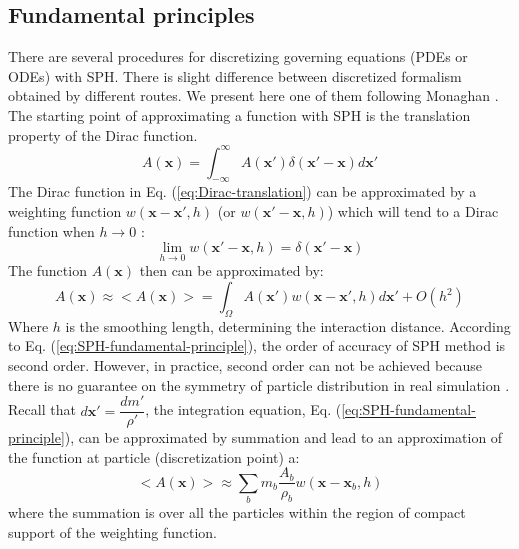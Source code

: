 \documentclass[journal abbreviation, manuscript]{copernicus}
\begin{document}
\subsection{Fundamental principles}
There are several procedures for discretizing governing equations (PDEs or ODEs) with SPH. There is slight difference between discretized formalism obtained by different routes. We present here one of them following Monaghan \citep{monaghan1992smoothed, monaghan2005smoothed}. The starting point of approximating a function with SPH is the translation property of the Dirac function.
\begin{equation}
A(\textbf{x})=\int_{-\infty}^{\infty} A(\textbf{x} \prime) \delta (\textbf{x} \prime - \textbf{x}) d\textbf{x} \prime
\label{eq:Dirac-translation}
\end{equation}
The Dirac function in Eq. (\ref{eq:Dirac-translation}) can be approximated by a weighting function $w(\textbf{x}-\textbf{x}\prime, h)$ (or $w(\textbf{x}\prime-\textbf{x}, h)$) which will tend to a Dirac function when $h \rightarrow 0$ :
\begin{equation}
\lim _{h \rightarrow 0} w(\textbf{x} \prime-\textbf{x}, h) =  \delta (\textbf{x} \prime - \textbf{x})
\label{eq:SPH_kernel_delta}
\end{equation}
The function $A(\textbf{x})$ then can be approximated by:
\begin{equation}
A(\textbf{x}) \approx <A(\textbf{x})> = \int_{\Omega} A(\textbf{x} \prime) w(\textbf{x}-\textbf{x}\prime, h) d\textbf{x}\prime + O(h^2)
\label{eq:SPH-fundamental-principle}
\end{equation}
Where $h$ is the smoothing length, determining the interaction distance. According to Eq. (\ref{eq:SPH-fundamental-principle}), the order of accuracy of SPH method is second order. However, in practice, second order can not be achieved because there is no guarantee on the symmetry of particle distribution in real simulation \citep{price2012smoothed}.
Recall that $d\textbf{x}\prime = \dfrac{dm \prime}{\rho \prime}$, the integration equation, Eq. (\ref{eq:SPH-fundamental-principle}), can be approximated by summation and lead to an approximation of the function at particle (discretization point) a:
\begin{equation}
<A(\textbf{x})> \approx \sum_b m_b \dfrac{A_b}{\rho_b} w(\textbf{x}-\textbf{x}_b, h)
\label{eq:SPH-approximation-sum}
\end{equation}
where the summation is over all the particles within the region of compact support of the weighting function. 
\end{document}
